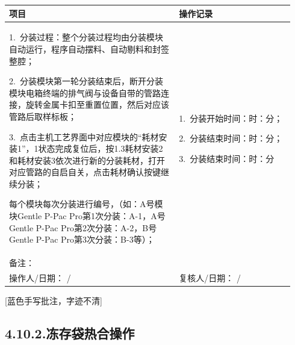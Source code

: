 \documentclass[UTF8,10pt,a4paper,fontset=fandol]{ctexart}
\newcommand{\fieldvalue}[1]{#1}
\newcommand{\handwritten}[1]{#1}
\begin{document}
\begin{center}
\begin{tabular}{|p{0.56\linewidth}|p{0.38\linewidth}|}
\hline
\centering 项目 & \centering 操作记录\\
\hline
1.\ 分装过程：整个分装过程均由分装模块自动运行，程序自动摆料、自动剔料和封签整腔；

2.\ 分装模块第一轮分装结束后，断开分装模块电箱终端的排气阀与设备自带的管路连接，旋转金属卡扣至重置位置，然后对应该管路后取样标板；

3.\ 点击主机工艺界面中对应模块的“耗材安装1”，1状态完成复位后，按1.3耗材安装2和耗材安装3依次进行新的分装耗材，打开对应管路的自启自关，点击耗材确认按键继续分装；

每个模块每次分装进行编号，（如：A号模块Gentle P-Pac Pro第1次分装：A-1，A号Gentle P-Pac Pro第2次分装：A-2，B号Gentle P-Pac Pro第3次分装：B-3等）；
&
1.\ 分装开始时间：\underline{\hspace{1.2cm}}时：\underline{\hspace{1.2cm}}分；

2.\ 分装结束时间：\underline{\hspace{1.2cm}}时：\underline{\hspace{1.2cm}}分；

3.\ 分装结束时间：\underline{\hspace{1.2cm}}时：\underline{\hspace{1.2cm}}分\\
\hline
备注： & \\
\hline
操作人/日期：
\fieldvalue{\handwritten{/}}
&
复核人/日期：
\fieldvalue{\handwritten{/}}
\\
\hline
\end{tabular}
\end{center}

\handwritten{[蓝色手写批注，字迹不清]}

\subsection*{4.10.2.\quad 冻存袋热合操作}
\end{document}
